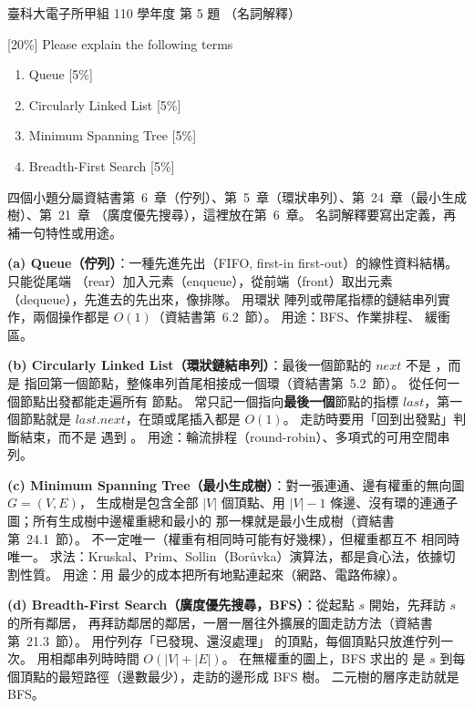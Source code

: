 \begin{pastexam}[label={px:ntust-110-ete-ds-05}]{臺科大電子所甲組 110 學年度 第 5 題}
（名詞解釋）

{[}20\%{]} Please explain the following terms
\begin{enumerate}[label=(\alph*)]
\item Queue [5\%]
\item Circularly Linked List [5\%]
\item Minimum Spanning Tree [5\%]
\item Breadth-First Search [5\%]
\end{enumerate}
\end{pastexam}

\begin{pastsoln}
四個小題分屬資結書第~6~章（佇列）、第~5~章（環狀串列）、第~24~章（最小生成樹）、第~21~章
（廣度優先搜尋），這裡放在第~6~章。 名詞解釋要寫出定義，再補一句特性或用途。

\textbf{(a) Queue（佇列）}：一種先進先出（FIFO, first-in first-out）的線性資料結構。 只能從尾端
（rear）加入元素（enqueue），從前端（front）取出元素（dequeue），先進去的先出來，像排隊。 用環狀
陣列或帶尾指標的鏈結串列實作，兩個操作都是 $O(1)$（資結書第~6.2~節）。 用途：BFS、作業排程、
緩衝區。

\textbf{(b) Circularly Linked List（環狀鏈結串列）}：最後一個節點的 $\mathit{next}$ 不是 \NIL，而是
指回第一個節點，整條串列首尾相接成一個環（資結書第~5.2~節）。 從任何一個節點出發都能走遍所有
節點。 常只記一個指向\textbf{最後一個}節點的指標 $\mathit{last}$，第一個節點就是
$\mathit{last}.\mathit{next}$，在頭或尾插入都是 $O(1)$。 走訪時要用「回到出發點」判斷結束，而不是
遇到 \NIL。 用途：輪流排程（round-robin）、多項式的可用空間串列。

\textbf{(c) Minimum Spanning Tree（最小生成樹）}：對一張連通、邊有權重的無向圖 $G = (V, E)$，
生成樹是包含全部 $|V|$ 個頂點、用 $|V| - 1$ 條邊、沒有環的連通子圖；所有生成樹中邊權重總和最小的
那一棵就是最小生成樹（資結書第~24.1~節）。 不一定唯一（權重有相同時可能有好幾棵），但權重都互不
相同時唯一。 求法：Kruskal、Prim、Sollin（Borůvka）演算法，都是貪心法，依據切割性質。 用途：用
最少的成本把所有地點連起來（網路、電路佈線）。

\textbf{(d) Breadth-First Search（廣度優先搜尋，BFS）}：從起點 $s$ 開始，先拜訪 $s$ 的所有鄰居，
再拜訪鄰居的鄰居，一層一層往外擴展的圖走訪方法（資結書第~21.3~節）。 用佇列存「已發現、還沒處理」
的頂點，每個頂點只放進佇列一次。 用相鄰串列時時間 $O(|V| + |E|)$。 在無權重的圖上，BFS 求出的
是 $s$ 到每個頂點的最短路徑（邊數最少），走訪的邊形成 BFS 樹。 二元樹的層序走訪就是 BFS。
\end{pastsoln}
